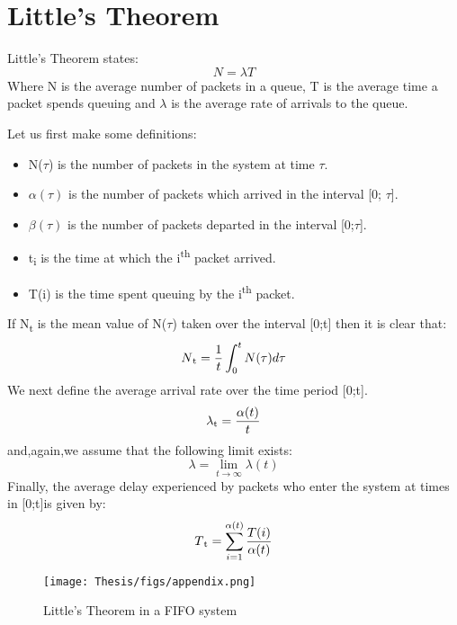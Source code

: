 \chapter{Little's Theorem}	%
Little's Theorem states:
\begin{equation}
    N = \lambda T
\end{equation}
Where N is the average number of packets in a queue, T is the average time a packet spends queuing and $\lambda$ is the average rate of arrivals to the queue.
\par Let us first make some definitions:
\begin{itemize}
    \item N($\tau$) is the number of packets in the system at time $\tau$.
    \item $\alpha(\tau)$ is the number of packets which arrived in the interval [0; $\tau$].
    \item $\beta(\tau)$ is the number of packets departed in the interval [0;$\tau$].
    \item t\textsubscript{i} is the time at which the i\textsuperscript{th} packet arrived.
    \item T(i) is the time spent queuing by the i\textsuperscript{th} packet.
\end{itemize}
If N\textsubscript{t} is the mean value of N($\tau$) taken over the interval [0;t] then it is clear that:
\begin{equation}
    N\textsubscript{t} = \frac{1}{t}\int_{0}^{t} N(\tau) d\tau
\end{equation}
We next define the average arrival rate over the time period [0;t].
\begin{equation}
    \lambda\textsubscript{t} = \frac{\alpha(t)}{t}
\end{equation}
and,again,we assume that the following limit exists:
\begin{equation}
    \lambda = \lim_{t\to\infty} \lambda(t)
\end{equation}
Finally, the average delay experienced by packets who enter the system at times in [0;t]is given by:
\begin{equation}
    T\textsubscript{t} = \sum_{i=1}^{\alpha(t)} \frac{T(i)}{\alpha(t)} 
\end{equation}
\begin{figure}[h!]
    \centering
    \texttt{[image: Thesis/figs/appendix.png]}
    \caption{Little's Theorem in a FIFO system}
    \label{fig:my_label}
\end{figure}
